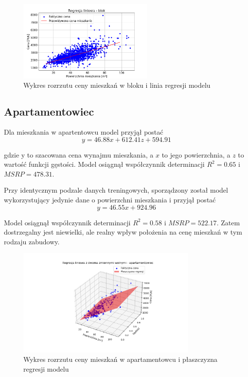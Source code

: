 \documentclass[10pt]{article}
\begin{document}
\begin{figure}[H]
    \centering
    \includegraphics[width=0.6\textwidth]{regression-blok.png}
    \caption{Wykres rozrzutu ceny mieszkań w bloku i linia regresji modelu}
    \label{fig:regression-blok}
\end{figure}


\subsection{Apartamentowiec}
Dla mieszkania w apartentowcu model przyjął postać 
\begin {equation}
y = 46.88x + 612.41z + 594.91
\end{equation}

gdzie y to szacowana cena wynajmu mieszkania, a $ x $ to jego powierzchnia, a $ z $ to wartość funkcji gęstości.
Model osiągnął współczynnik determinacji $ R^2 = 0.65 $ i $ MSRP = 478.31 $.

Przy identycznym podzale danych treningowych, sporządzony został model wykorzystujący jedynie dane o powierzchni mieszkania i przyjął postać
\begin {equation}
y = 46.55x + 924.96
\end{equation}

Model osiągnął współczynnik determinacji $ R^2 = 0.58 $ i $ MSRP = 522.17 $.
Zatem dostrzegalny jest niewielki, ale realny wpływ położenia na cenę mieszkań w tym rodzaju zabudowy.

\begin{figure}[H]
    \centering
    \includegraphics[width=0.8\textwidth]{regression-2d-apartamentowiec.png}
    \caption{Wykres rozrzutu ceny mieszkań w apartamentowcu i płaszczyzna regresji modelu}
    \label{fig:regression-2d-apartamentowiec}
\end{figure}
\end{document}
